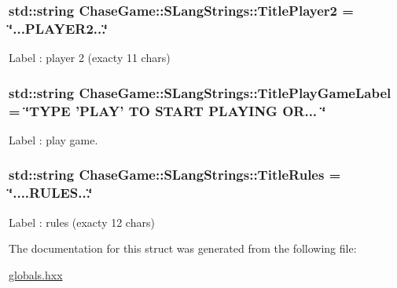 \hypertarget{struct_chase_game_1_1_s_lang_strings_a462589a11d9d088d7efdf6572c810c08}{
\subsubsection[{Title\-Player2}]{\setlength{\rightskip}{0pt plus 5cm}std\-::string Chase\-Game\-::\-S\-Lang\-Strings\-::\-Title\-Player2 = \char`\"{}...P\-L\-A\-Y\-E\-R2...\char`\"{}}}\label{struct_chase_game_1_1_s_lang_strings_a462589a11d9d088d7efdf6572c810c08}


Label \-: player 2 (exacty 11 chars) 

\hypertarget{struct_chase_game_1_1_s_lang_strings_a2c84435e4b127789447a00398ac5c2b1}{
\subsubsection[{Title\-Play\-Game\-Label}]{\setlength{\rightskip}{0pt plus 5cm}std\-::string Chase\-Game\-::\-S\-Lang\-Strings\-::\-Title\-Play\-Game\-Label = \char`\"{}T\-Y\-P\-E 'P\-L\-A\-Y' T\-O S\-T\-A\-R\-T P\-L\-A\-Y\-I\-N\-G O\-R... \char`\"{}}}\label{struct_chase_game_1_1_s_lang_strings_a2c84435e4b127789447a00398ac5c2b1}


Label \-: play game. 

\hypertarget{struct_chase_game_1_1_s_lang_strings_a80834f6e732fff6fae2ea0f2e341c7bd}{
\subsubsection[{Title\-Rules}]{\setlength{\rightskip}{0pt plus 5cm}std\-::string Chase\-Game\-::\-S\-Lang\-Strings\-::\-Title\-Rules = \char`\"{}....R\-U\-L\-E\-S...\char`\"{}}}\label{struct_chase_game_1_1_s_lang_strings_a80834f6e732fff6fae2ea0f2e341c7bd}


Label \-: rules (exacty 12 chars) 



The documentation for this struct was generated from the following file\-:\begin{DoxyCompactItemize}
\item 
\hyperlink{globals_8hxx}{globals.\-hxx}\end{DoxyCompactItemize}
